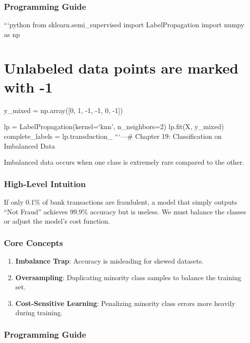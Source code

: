 \subsubsection{Programming Guide}\label{programming-guide-17}

```python from sklearn.semi\_supervised import LabelPropagation import
numpy as np

\section{Unlabeled data points are marked with
-1}\label{unlabeled-data-points-are-marked-with--1}

y\_mixed = np.array({[}0, 1, -1, -1, 0, -1{]})

lp = LabelPropagation(kernel=`knn', n\_neighbors=2) lp.fit(X, y\_mixed)
complete\_labels = lp.transduction\_ ```\n\n---\n\n\# Chapter 19:
Classification on Imbalanced Data

Imbalanced data occurs when one class is extremely rare compared to the
other.

\subsubsection{High-Level Intuition}\label{high-level-intuition-18}

If only 0.1\% of bank transactions are fraudulent, a model that simply
outputs ``Not Fraud'' achieves 99.9\% accuracy but is useless. We must
balance the classes or adjust the model's cost function.

\subsubsection{Core Concepts}\label{core-concepts-11}

\begin{enumerate}
\def\labelenumi{\arabic{enumi}.}
\tightlist
\item
  \textbf{Imbalance Trap}: Accuracy is misleading for skewed datasets.
\item
  \textbf{Oversampling}: Duplicating minority class samples to balance
  the training set.
\item
  \textbf{Cost-Sensitive Learning}: Penalizing minority class errors
  more heavily during training.
\end{enumerate}

\subsubsection{Programming Guide}\label{programming-guide-18}

